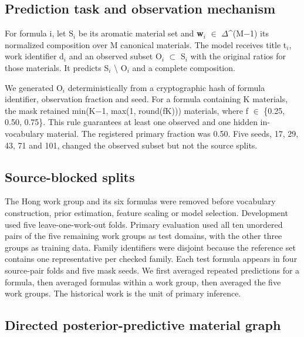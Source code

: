 \documentclass[12pt]{article}
\begin{document}
\subsection*{Prediction task and observation mechanism}

For formula i, let S\ensuremath{_{i}} be its aromatic material set and \textbf{w}\ensuremath{_{i}} \ensuremath{\in} \ensuremath{\Delta}\textasciicircum{}(M\ensuremath{-}1) its normalized composition over M canonical materials. The model receives title t\ensuremath{_{i}}, work identifier d\ensuremath{_{i}} and an observed subset O\ensuremath{_{i}} \ensuremath{\subset} S\ensuremath{_{i}} with the original ratios for those materials. It predicts S\ensuremath{_{i}} \textbackslash{} O\ensuremath{_{i}} and a complete composition.

We generated O\ensuremath{_{i}} deterministically from a cryptographic hash of formula identifier, observation fraction and seed. For a formula containing K materials, the mask retained min(K\ensuremath{-}1, max(1, round(fK))) materials, where f \ensuremath{\in} \{0.25, 0.50, 0.75\}. This rule guarantees at least one observed and one hidden in-vocabulary material. The registered primary fraction was 0.50. Five seeds, 17, 29, 43, 71 and 101, changed the observed subset but not the source splits.

\subsection*{Source-blocked splits}

The Hong work group and its six formulas were removed before vocabulary construction, prior estimation, feature scaling or model selection. Development used five leave-one-work-out folds. Primary evaluation used all ten unordered pairs of the five remaining work groups as test domains, with the other three groups as training data. Family identifiers were disjoint because the reference set contains one representative per checked family. Each test formula appears in four source-pair folds and five mask seeds. We first averaged repeated predictions for a formula, then averaged formulas within a work group, then averaged the five work groups. The historical work is the unit of primary inference.

\subsection*{Directed posterior-predictive material graph}
\end{document}
